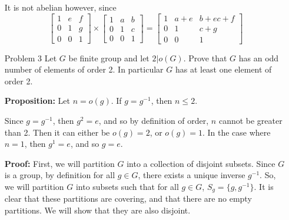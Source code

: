 \documentclass[letterpaper]{article}
\begin{document}
\begin{itemize}
            It is not abelian however, since \[
                  \begin{bmatrix}
                        1 & e & f \\
                        0 & 1 & g \\
                        0 & 0 & 1
                  \end{bmatrix} \times \begin{bmatrix}
                        1 & a & b \\
                        0 & 1 & c \\
                        0 & 0 & 1
                  \end{bmatrix} = \begin{bmatrix}
                        1 & a+e & b+ec+f \\
                        0 & 1   & c+g    \\
                        0 & 0   & 1
                  \end{bmatrix}\]
            \pagebreak

      \item[Problem 3] Let \(G\) be finite group and let \(2| o(G)\). Prove that \(G\) has an odd number of elements of order 2. In particular \(G\) has at least one element of order 2.


            \textbf{Proposition: } Let \(n = o(g)\). If \(g = g^{-1}\), then \(n \leq 2\).

            Since \(g = g^{-1}\), then \(g^2 = e\), and so by definition of order, \(n\) cannot be greater than 2. Then it can either be \(o(g) = 2\), or \(o(g) = 1\). In the case where \(n = 1\), then \(g^1 = e\), and so \(g = e\).

            \textbf{Proof: }
            First, we will partition \(G\) into a collection of disjoint subsets. Since \(G\) is a group, by definition for all \(g \in G\), there exists a unique inverse \(g^{-1}\).
            So, we will partition \(G\) into subsets such that for all \(g \in G\), \(S_g = \{g, g^{-1}\}\). It is clear that these partitions are covering, and that there are no empty partitions. We will show that they are also disjoint.


\end{itemize}
\end{document}
